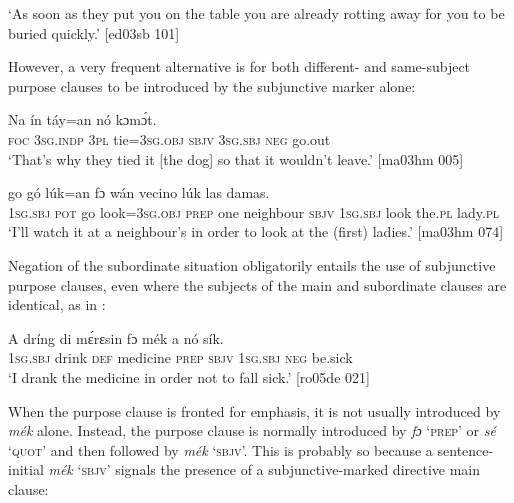\glt ‘As soon as they put you on the table you are already rotting away 
for you to be buried quickly.’ [ed03sb 101]
\z

However, a very frequent alternative is for both different-  and same-subject  purpose clauses to be introduced by the subjunctive marker alone:


\ea%
    \label{ex:key:1496}
    \gll Na  ín      táy=an           nó  kɔmɔ́t.\\
\textsc{foc}  \textsc{3sg.indp}  \textsc{3pl}  tie=\textsc{3sg.obj}  \textsc{sbjv}    \textsc{3sg.sbj}  \textsc{neg}  go.out\\

\glt ‘That’s why they tied it [the dog] so that it wouldn’t leave.’ [ma03hm 005]
\z


\ea%
    \label{ex:key:1497}
    \gll {}   go  gó  lúk=an    fɔ  wán    vecino           
lúk    las    damas.\\
\textsc{1sg.sbj}  \textsc{pot}  go  look=\textsc{3sg.obj}  \textsc{prep}  one    neighbour  \textsc{sbjv}    \textsc{1sg.sbj}  
look    the.\textsc{pl}  lady.\textsc{pl}\\
\glt ‘I’ll watch it at a neighbour’s in order to look at the (first) ladies.’ [ma03hm 074]
\z

Negation of the subordinate situation obligatorily entails the use of subjunctive purpose clauses, even where the subjects of the main and subordinate clauses are identical, as in : 


\ea%
    \label{ex:key:1498}
    \gll A    dríng  di  mɛ́rɛsin    fɔ  mék    a    nó  sík.\\
\textsc{1sg.sbj}  drink  \textsc{def}  medicine  \textsc{prep}  \textsc{sbjv}    \textsc{1sg.sbj}  \textsc{neg}  be.sick\\

\glt ‘I drank the medicine in order not to fall sick.’ [ro05de 021]
\z

When the purpose clause is fronted for emphasis, it is not usually introduced by \textit{mék} alone. Instead, the purpose clause is normally introduced by \textit{fɔ} ‘\textsc{prep}’ or \textit{sé} ‘\textsc{quot}’ and then followed by \textit{mék} ‘\textsc{sbjv}’. This is probably so because a sentence-initial \textit{mék} ‘\textsc{sbjv}’ signals the presence of a subjunctive-marked directive main clause: 


